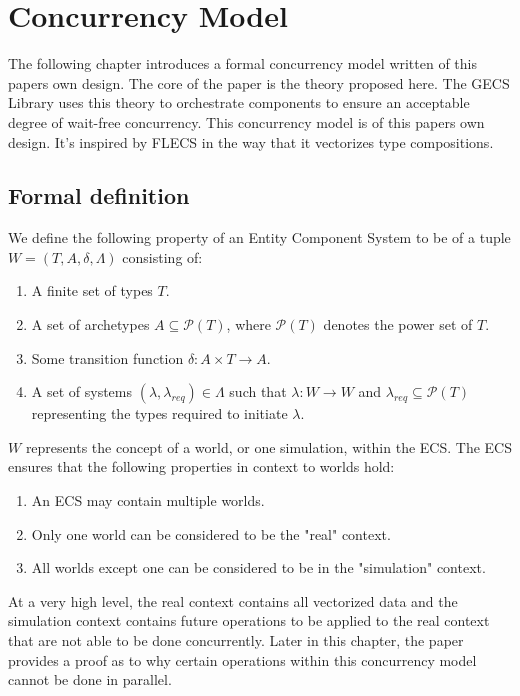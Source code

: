 
\section{Concurrency Model}
\label{chap:2}
The following chapter introduces a formal concurrency model written of this papers own design. The core of the paper is the theory proposed here. The GECS Library uses this theory to orchestrate components to ensure an acceptable degree of wait-free concurrency. This concurrency model is of this papers own design. It's inspired by FLECS in the way that it vectorizes type compositions.

\subsection{Formal definition} \label{section:formal_definition}
We define the following property of an Entity Component System to be of a tuple $W = (T, A, \delta, \Lambda)$ consisting of:
\begin{enumerate}
    \item A finite set of types $T$.
    \item A set of archetypes $A \subseteq \mathcal{P}(T)$, where $\mathcal{P}(T)$ denotes the power set of $T$.
    \item Some transition function $\delta : A \times T \rightarrow A$.
    \item A set of systems $(\lambda, \lambda_{req}) \in \Lambda$ such that $\lambda : W \rightarrow W$ and $\lambda_{req} \subseteq \mathcal{P}(T)$ representing the types required to initiate $\lambda$.
\end{enumerate}
$W$ represents the concept of a world, or one simulation, within the ECS. The ECS ensures that the following properties in context to worlds hold:

\begin{enumerate}
    \item An ECS may contain multiple worlds.
    \item Only one world can be considered to be the "real" context.
    \item All worlds except one can be considered to be in the "simulation" context.
\end{enumerate}

At a very high level, the real context contains all vectorized data and the simulation context contains future operations to be applied to the real context that are not able to be done concurrently. Later in this chapter, the paper provides a proof as to why certain operations within this concurrency model cannot be done in parallel. 

